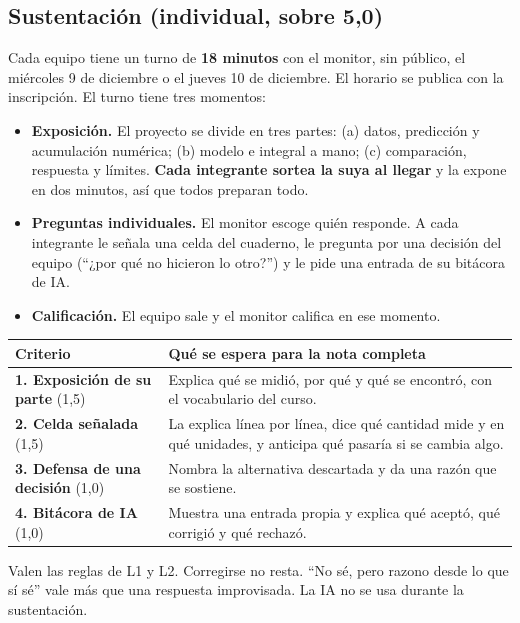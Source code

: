 \documentclass[12pt,letterpaper]{article}
\newcommand{\fechaSustUno}{miércoles 9 de diciembre}
\newcommand{\fechaSustDos}{jueves 10 de diciembre}
\begin{document}
\subsection{Sustentación (individual, sobre 5,0)}
Cada equipo tiene un turno de \textbf{18 minutos} con el monitor, sin público, el \fechaSustUno{} o el \fechaSustDos. El horario se publica con la inscripción. El turno tiene tres momentos:
\begin{itemize}[itemsep=0.1em]
    \item \textbf{Exposición.} El proyecto se divide en tres partes: (a) datos, predicción y acumulación numérica; (b) modelo e integral a mano; (c) comparación, respuesta y límites. \textbf{Cada integrante sortea la suya al llegar} y la expone en dos minutos, así que todos preparan todo.
    \item \textbf{Preguntas individuales.} El monitor escoge quién responde. A cada integrante le señala una celda del cuaderno, le pregunta por una decisión del equipo (``¿por qué no hicieron lo otro?'') y le pide una entrada de su bitácora de IA.
    \item \textbf{Calificación.} El equipo sale y el monitor califica en ese momento.
\end{itemize}

\begin{center}
\small
\begin{tabularx}{\textwidth}{L{4.2cm}Y}
\toprule
\textbf{Criterio} & \textbf{Qué se espera para la nota completa}\\
\midrule
\textbf{1. Exposición de su parte} (1,5) & Explica qué se midió, por qué y qué se encontró, con el vocabulario del curso.\\
\textbf{2. Celda señalada} (1,5) & La explica línea por línea, dice qué cantidad mide y en qué unidades, y anticipa qué pasaría si se cambia algo.\\
\textbf{3. Defensa de una decisión} (1,0) & Nombra la alternativa descartada y da una razón que se sostiene.\\
\textbf{4. Bitácora de IA} (1,0) & Muestra una entrada propia y explica qué aceptó, qué corrigió y qué rechazó.\\
\bottomrule
\end{tabularx}
\end{center}

Valen las reglas de L1 y L2. Corregirse no resta. ``No sé, pero razono desde lo que sí sé'' vale más que una respuesta improvisada. La IA no se usa durante la sustentación.
\end{document}

